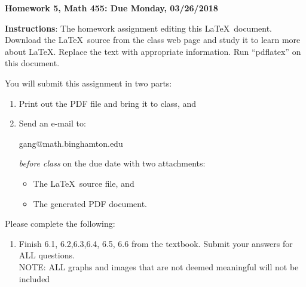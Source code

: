 \documentclass[11pt]{article}
\begin{document}
\begin{title}
	{\Large\bf Homework 5, Math 455: Due Monday, 03/26/2018}
\end{title}

\author{\bf Alexander Van Roijen}

\maketitle
{\bf Instructions}:  The homework assignment editing this \LaTeX\ document.  Download the \LaTeX\ source from the class web page and study
it to learn more about \LaTeX.  Replace the text with appropriate information.  Run ``pdflatex'' on this document.

You will submit this assignment in two parts:
\begin{enumerate}
\item Print out the PDF file and bring it to class, and
\item Send an e-mail to:
\begin{center}
gang@math.binghamton.edu
\end{center}
\emph{before class} on the due date with two attachments:
\begin{itemize}
\item The \LaTeX\ source file, and
\item The generated PDF document.
\end{itemize}
\end{enumerate}
\newpage
Please complete the following:
\begin{enumerate}
\item  Finish 6.1, 6.2,6.3,6.4, 6.5, 6.6 from the textbook.  Submit your
answers for {\color{red}ALL} questions.\\
NOTE: ALL graphs and images that are not deemed meaningful will not be included
\end{enumerate}
\end{document}
